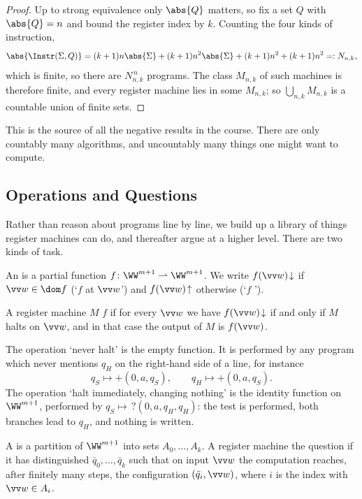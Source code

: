 \begin{proof}
	Up to strong equivalence only $\abs{Q}$ matters, so fix a set $Q$ with $\abs{Q} = n$ and bound the register index by $k$. Counting the four kinds of instruction,
	$$\abs{\Instr(\Sigma,Q)} = (k+1)n\abs{\Sigma} + (k+1)n^2\abs{\Sigma} + (k+1)n^2 + (k+1)n^2 =: N_{n,k},$$
	which is finite, so there are $N_{n,k}^{\,n}$ programs. The class $M_{n,k}$ of such machines is therefore finite, and every register machine lies in some $M_{n,k}$; so $\bigcup_{n,k}M_{n,k}$ is a countable union of finite sets.
\end{proof}

This is the source of all the negative results in the course. There are only countably many algorithms, and uncountably many things one might want to compute.

\subsection{Operations and Questions}

Rather than reason about programs line by line, we build up a library of things register machines can do, and thereafter argue at a higher level. There are two kinds of task.

\begin{definition}[Operation]
	An  is a partial function $f \colon \WW^{m+1} \rightharpoonup \WW^{m+1}$. We write $f(\vv w)\!\downarrow$ if $\vv w \in \dom f$ (`$f$  at $\vv w$') and $f(\vv w)\!\uparrow$ otherwise (`$f$ ').

	A register machine $M$  $f$ if for every $\vv w$ we have $f(\vv w)\!\downarrow$ if and only if $M$ halts on $\vv w$, and in that case the output of $M$ is $f(\vv w)$.
\end{definition}

\begin{example}
	The operation `never halt' is the empty function. It is performed by any program which never mentions $q_H$ on the right-hand side of a line, for instance
	$$q_S \mapsto +(0,a,q_S), \qquad q_H \mapsto +(0,a,q_S).$$
	The operation `halt immediately, changing nothing' is the identity function on $\WW^{m+1}$, performed by $q_S \mapsto\, ?(0,a,q_H,q_H)$: the test is performed, both branches lead to $q_H$, and nothing is written.
\end{example}

\begin{definition}[Question]
	A  is a partition of $\WW^{m+1}$ into sets $A_0, \dots, A_k$. A register machine  the question if it has distinguished  $\bar q_0, \dots, \bar q_k$ such that on input $\vv w$ the computation reaches, after finitely many steps, the configuration $(\bar q_i, \vv w)$, where $i$ is the index with $\vv w \in A_i$.
\end{definition}

